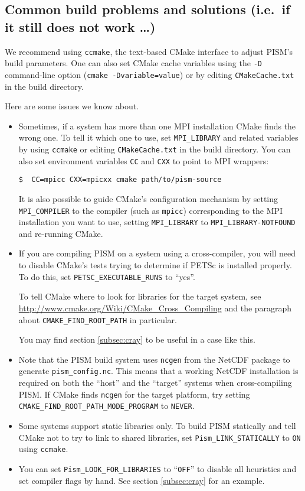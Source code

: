 \documentclass[titlepage,letterpaper,final]{scrartcl}
\begin{document}
\subsection{Common build problems and solutions (i.e.~if it still does not work \dots)}
\label{subsec:config}

We recommend using \texttt{ccmake}, the text-based CMake interface to adjust
PISM's build parameters. One can also set CMake cache variables using the
\texttt{-D} command-line option (\texttt{cmake -Dvariable=value}) or by editing
\texttt{CMakeCache.txt} in the build directory.

Here are some issues we know about.
\begin{itemize}
\item Sometimes, if a system has more than one MPI installation CMake finds the
  wrong one. To tell it which one to use, set \texttt{MPI_LIBRARY} and related
  variables by using \texttt{ccmake} or editing \texttt{CMakeCache.txt} in the
  build directory. You can also set environment variables \texttt{CC} and
  \texttt{CXX} to point to MPI wrappers:
\begin{verbatim}
$  CC=mpicc CXX=mpicxx cmake path/to/pism-source
\end{verbatim}

  It is also possible to guide CMake's configuration mechanism by setting
  \texttt{MPI_COMPILER} to the compiler (such as \texttt{mpicc}) corresponding
  to the MPI installation you want to use, setting \texttt{MPI_LIBRARY} to
  \texttt{MPI_LIBRARY-NOTFOUND} and re-running CMake.
\item If you are compiling PISM on a system using a cross-compiler, you will
  need to disable CMake's tests trying to determine if PETSc is installed
  properly. To do this, set \texttt{PETSC_EXECUTABLE_RUNS} to ``yes''.

  To tell CMake where to look for libraries for the target system, see
  \url{http://www.cmake.org/Wiki/CMake_Cross_Compiling} and the paragraph about
  \texttt{CMAKE_FIND_ROOT_PATH} in particular.

  You may find section \ref{subsec:cray} to be useful in a case like this.
\item Note that the PISM build system uses \texttt{ncgen} from the NetCDF
  package to generate \mbox{\texttt{pism_config.nc}}. This means that a working
  NetCDF installation is required on both the ``host'' and the ``target''
  systems when cross-compiling PISM. If CMake finds \texttt{ncgen} for the
  target platform, try setting
  \mbox{\texttt{CMAKE_FIND_ROOT_PATH_MODE_PROGRAM}} to \texttt{NEVER}.
\item Some systems support static libraries only. To build PISM statically and
  tell CMake not to try to link to shared libraries, set
  \texttt{Pism_LINK_STATICALLY} to \texttt{ON} using \texttt{ccmake}.
\item You can set \texttt{Pism_LOOK_FOR_LIBRARIES} to ``\texttt{OFF}''
  to disable all heuristics and set compiler flags by hand. See
  section \ref{subsec:cray} for an example.
\end{itemize}
\end{document}
